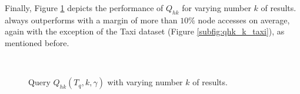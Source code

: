 Finally, Figure \ref{fig:query_qhk_k} depicts the performance of $Q_{hk}$ for varying number $k$ of results. \btsr always outperforms \tsr  with a margin of more than $10\%$ node accesses on average, again with the exception of the Taxi dataset (Figure \ref{subfig:qhk_k_taxi}), as mentioned before.

\begin{figure}[!tb]
	\centering
	 \\
	\caption{Query $Q_{hk}(T_q, k, \gamma)$ with varying number $k$ of results.}
	\label{fig:query_qhk_k}
\end{figure}

